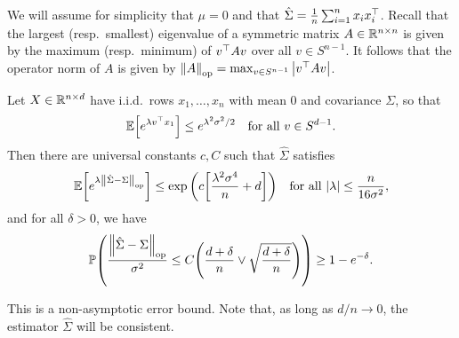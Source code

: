 We will assume for simplicity that $\mu = 0$ and that $\hat\Sigma = \frac1n \sum_{i=1}^n x_i x_i^\top$.  Recall that the largest (resp.\ smallest) eigenvalue of a symmetric matrix $A \in \mathbb R^{n\times n}$ is given by the maximum (resp.\ minimum) of $v^\top A v$ over all $v \in S^{n-1}$. It follows that the operator norm of $A$ is given by $\norm{A}_\mathrm{op} = \max_{v \in S^{n-1}} \abs{v^\top A v}$. 

\begin{theorem}
	Let $X \in \mathbb R^{n\times d}$ have i.i.d.\ rows $x_1, \dotsc, x_n$ with mean 0 and covariance $\Sigma$, so that 
	\[
	\mathbb E\qty[ e^{\lambda v^\top x_1}] \leq e^{\lambda^2\sigma^2/2} \quad\text{for all $v \in S^{d-1}$}. 
	\]
	Then there are universal constants $c, C$ such that $\hat\Sigma$ satisfies 
	\[
	\mathbb E\qty[e^{\lambda\norm{\hat\Sigma - \Sigma}_\mathrm{op}}] \leq \exp\qty(c \qty[ \frac{\lambda^2\sigma^4}{n} + d]) \quad\text{for all $\abs{\lambda} \leq \frac n{16\sigma^2}$},
	\]
	and for all $\delta > 0$, we have
	\[
	\mathbb P\qty(\frac{\norm{\hat\Sigma - \Sigma}_\mathrm{op}}{\sigma^2} \leq C \qty(\frac{d + \delta}{n} \lor \sqrt{\frac{d + \delta}{n}})) \geq 1 - e^{-\delta}. 
	\]
\end{theorem}

This is a non-asymptotic error bound. Note that, as long as $d/n \to 0$, the estimator $\hat\Sigma$ will be consistent. 

